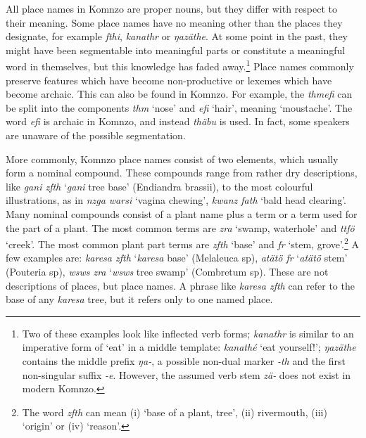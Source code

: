All place names in Komnzo are proper nouns, but they differ with respect to their meaning. Some place names have no meaning other than the places they designate, for example \emph{fthi}, \emph{kanathr} or \emph{ŋazäthe}. At some point in the past, they might have been segmentable into meaningful parts or constitute a meaningful word in themselves, but this knowledge has faded away.\footnote{Two of these examples look like inflected verb forms; \emph{kanathr} is similar to an imperative form of `eat' in a middle template: \emph{kanathé} `eat yourself!'; \emph{ŋazäthe} contains the middle prefix \emph{ŋa-}, a possible non-dual marker \emph{-th} and the first non-singular suffix \emph{-e}. However, the assumed verb stem \emph{zä-} does not exist in modern Komnzo.} Place names commonly preserve features which have become non-productive or lexemes which have become archaic. This can also be found in Komnzo. For example, the  \emph{thmefi} can be split into the components \emph{thm} `nose' and \emph{efi} `hair', meaning `moustache'.  The word \emph{efi} is archaic in Komnzo, and instead \emph{thäbu} is used. In fact, some speakers are unaware of the possible segmentation.%

More commonly, Komnzo place names consist of two elements, which usually form a nominal compound. These compounds range from rather dry descriptions, like \emph{gani zfth} `\emph{gani} tree base' (Endiandra brassii), to the most colourful illustrations, as in \emph{nzga warsi} `vagina chewing', \emph{kwanz fath} `bald head clearing'. Many nominal compounds consist of a plant name plus a  term or a term used for the part of a plant. The most common  terms are \emph{zra} `swamp, waterhole' and \emph{ttfö} `creek'. The most common plant part terms are \emph{zfth} `base' and \emph{fr} `stem, grove'.\footnote{The word \emph{zfth} can mean (i) `base of a plant, tree', (ii) rivermouth, (iii) `origin' or (iv) `reason'.} A few examples are: \emph{karesa zfth} `\emph{karesa} base' (Melaleuca sp), \emph{atätö fr} `\emph{atätö} stem' (Pouteria sp), \emph{wsws zra} `\emph{wsws} tree swamp' (Combretum sp). These are not descriptions of places, but place names. A phrase like \emph{karesa zfth} can refer to the base of any \emph{karesa} tree, but it refers only to one named place.%

